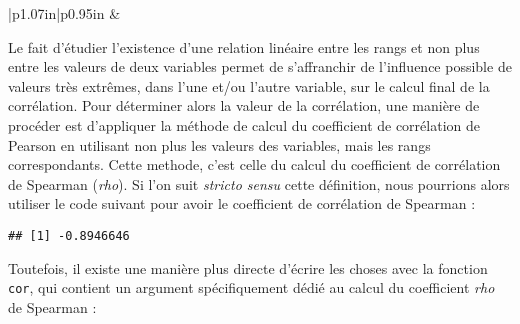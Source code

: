 \documentclass[
  french,
]{book}
\newenvironment{Shaded}{\begin{snugshade}}{\end{snugshade}}
\newcommand{\DataTypeTok}[1]{\textcolor[rgb]{0.13,0.29,0.53}{#1}}
\newcommand{\KeywordTok}[1]{\textcolor[rgb]{0.13,0.29,0.53}{\textbf{#1}}}
\newcommand{\NormalTok}[1]{#1}
\newcommand{\OperatorTok}[1]{\textcolor[rgb]{0.81,0.36,0.00}{\textbf{#1}}}
\newcommand{\StringTok}[1]{\textcolor[rgb]{0.31,0.60,0.02}{#1}}
\begin{document}
\begin{longtable}[c]{|p{1.07in}|p{0.95in}}
 &  \\




\end{longtable}

Le fait d'étudier l'existence d'une relation linéaire entre les rangs et non plus entre les valeurs de deux variables permet de s'affranchir de l'influence possible de valeurs très extrêmes, dans l'une et/ou l'autre variable, sur le calcul final de la corrélation. Pour déterminer alors la valeur de la corrélation, une manière de procéder est d'appliquer la méthode de calcul du coefficient de corrélation de Pearson en utilisant non plus les valeurs des variables, mais les rangs correspondants. Cette methode, c'est celle du calcul du coefficient de corrélation de Spearman (\emph{rho}). Si l'on suit \emph{stricto sensu} cette définition, nous pourrions alors utiliser le code suivant pour avoir le coefficient de corrélation de Spearman :

\begin{Shaded}
\end{Shaded}

\begin{verbatim}
## [1] -0.8946646
\end{verbatim}

Toutefois, il existe une manière plus directe d'écrire les choses avec la fonction \texttt{cor}, qui contient un argument spécifiquement dédié au calcul du coefficient \emph{rho} de Spearman :

\begin{Shaded}
\end{Shaded}
\end{document}
